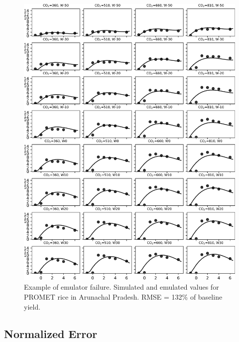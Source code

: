 \documentclass[10pt]{article}
\begin{document}
\begin{figure}[h!]
\includegraphics[width=\textwidth]{promet_rice_bad_arun.png}
\caption{Example of emulator failure. Simulated and emulated values for PROMET rice in Arunachal Pradesh. RMSE = 132\% of baseline yield.}
\label{fig:lpjmlrice}
\end{figure}


\clearpage
\subsection{Normalized Error}
\end{document}
